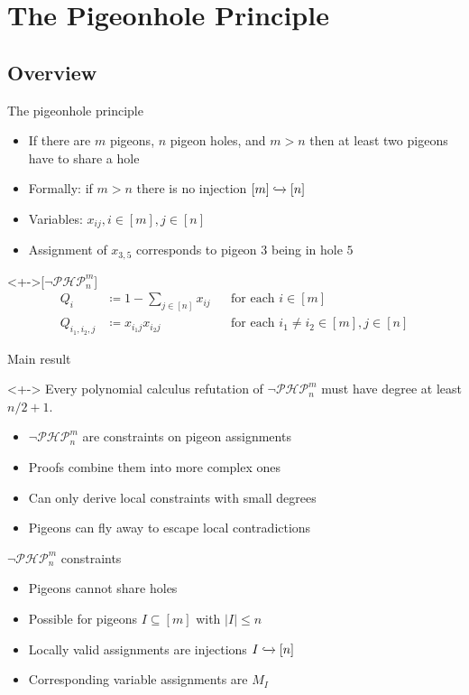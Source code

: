 \documentclass[xcolor={dvipsnames}, aspectratio=169]{beamer}
\newcommand{\PHP}{\ensuremath{\neg \mathcal{PHP}^m_n}\xspace}
\newcommand{\Qiij}{Q_{i_1, i_2, j}}
\begin{document}
\section{The Pigeonhole Principle}
\subsection{Overview}
\begin{frame}{The pigeonhole principle}
    \begin{itemize}[<+->]
        \item If there are $m$ pigeons, $n$ pigeon holes, and $m > n$ then at least two pigeons have to share a hole
        \item Formally: if $m > n$ there is no injection $[m] \xhookrightarrow{} [n]$
        \item Variables: $x_{i j}, i \in [m], j \in [n]$
        \item Assignment of $x_{3, 5}$ corresponds to pigeon $3$ being in hole $5$
    \end{itemize}
    \begin{definition}<+->[\PHP]
        \begin{align*}
            Q_i &\coloneqq 1 - \sum_{j \in [n]} x_{ij} &&\text{for each $i \in [m]$}\\
            \Qiij &\coloneqq x_{i_1j} x_{i_2j} &&\text{for each $i_1 \neq i_2 \in [m], j \in [n]$}
        \end{align*}
    \end{definition}
\end{frame}

\begin{frame}{Main result}
    \begin{theorem}<+->
        Every polynomial calculus refutation of \PHP must have degree at least $n/2 + 1$.
    \end{theorem}
    \begin{itemize}[<+->]
        \item \PHP are constraints on pigeon assignments
        \item Proofs combine them into more complex ones
        \item Can only derive local constraints with small degrees
        \item Pigeons can fly away to escape local contradictions
    \end{itemize}
\end{frame}

\begin{frame}{\PHP constraints}
    \begin{itemize}[<+->]
        \item Pigeons cannot share holes
        \item Possible for pigeons $I \subseteq [m]$ with $|I| \leq n$
        \item Locally valid assignments are injections $I \xhookrightarrow{} [n]$
        \item Corresponding variable assignments are $M_I$
    \end{itemize}
\end{frame}
\end{document}
